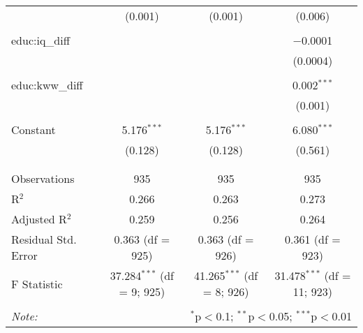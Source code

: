 \documentclass[11pt]{article} %
\begin{document}
\begin{table}[!htbp]
\begin{tabular}{@{\extracolsep{5pt}}lccc}
	& (0.001) & (0.001) & (0.006) \\ 
	& & & \\ 
   educ:iq\_diff &  &  & $-$0.0001 \\ 
	&  &  & (0.0004) \\ 
	& & & \\ 
   educ:kww\_diff &  &  & 0.002$^{***}$ \\ 
	&  &  & (0.001) \\ 
	& & & \\ 
   Constant & 5.176$^{***}$ & 5.176$^{***}$ & 6.080$^{***}$ \\ 
	& (0.128) & (0.128) & (0.561) \\ 
	& & & \\ 
  \hline \\[-1.8ex] 
  Observations & 935 & 935 & 935 \\ 
  R$^{2}$ & 0.266 & 0.263 & 0.273 \\ 
  Adjusted R$^{2}$ & 0.259 & 0.256 & 0.264 \\ 
  Residual Std. Error & 0.363 (df = 925) & 0.363 (df = 926) & 0.361 (df = 923) \\ 
  F Statistic & 37.284$^{***}$ (df = 9; 925) & 41.265$^{***}$ (df = 8; 926) & 31.478$^{***}$ (df = 11; 923) \\ 
  \hline 
  \hline \\[-1.8ex] 
  \textit{Note:}  & \multicolumn{3}{r}{$^{*}$p$<$0.1; $^{**}$p$<$0.05; $^{***}$p$<$0.01} \\ 
  \end{tabular} 
  \end{table} 
  
\end{document}
